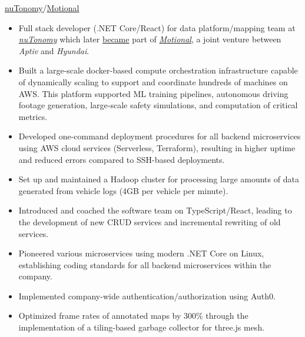 \documentclass[]{cv} %
\begin{document}

\entry
{\href{https://en.wikipedia.org/wiki/NuTonomy}{nuTonomy}/\href{https://www.aptiv.com/solutions/autonomous-mobility}{Motional}}
{
\vspace{-\belowdisplayshortskip}
\begin{itemize}
\item Full stack developer (.NET Core/React) for data platform/mapping team at \href{https://en.wikipedia.org/wiki/NuTonomy}{\emph{nuTonomy}} which later \href{https://techcrunch.com/2017/10/24/delphi-buys-nutonomy-for-400-million-to-scale-and-deliver-autonomous-vehicles/}{became} part of \href{https://www.aptiv.com/solutions/autonomous-mobility}{\emph{Motional}}, a joint venture between \emph{Aptiv} and \emph{Hyundai}.
\item Built a large-scale docker-based compute orchestration infrastructure capable of dynamically scaling to support and coordinate hundreds of machines on AWS. This platform supported ML training pipelines, autonomous driving footage generation, large-scale safety simulations, and computation of critical metrics.
\item Developed one-command deployment procedures for all backend microservices using AWS cloud services (Serverless, Terraform), resulting in higher uptime and reduced errors compared to SSH-based deployments.
\item Set up and maintained a Hadoop cluster for processing large amounts of data generated from vehicle logs (4GB per vehicle per minute).
\item Introduced and coached the software team on TypeScript/React, leading to the development of new CRUD services and incremental rewriting of old services.
\item Pioneered various microservices using modern .NET Core on Linux, establishing coding standards for all backend microservices within the company.
\item Implemented company-wide authentication/authorization using Auth0.
\item Optimized frame rates of annotated maps by 300\% through the implementation of a tiling-based garbage collector for three.js mesh.
\end{itemize}
}
\end{document}
